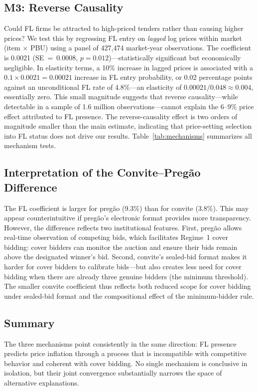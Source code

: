 \subsection{M3: Reverse Causality}

Could FL firms be attracted to high-priced tenders rather than causing
higher prices? We test this by regressing FL entry on \emph{lagged} log
prices within market (item $\times$ PBU) using a panel of 427,474
market-year observations. The coefficient is 0.0021 (SE~=~0.0008,
$p = 0.012$)---statistically significant but economically negligible.
In elasticity terms, a 10\% increase in lagged prices is associated with
a $0.1 \times 0.0021 = 0.00021$ increase in FL entry probability, or
0.02 percentage points against an unconditional FL rate of 4.8\%---an
elasticity of $0.00021 / 0.048 \approx 0.004$, essentially zero. This
small magnitude suggests that reverse causality---while detectable in a
sample of 1.6 million observations---cannot explain the 6--9\% price
effect attributed to FL presence. The reverse-causality effect is two %
orders of magnitude smaller than the main estimate, indicating that
price-setting selection into FL status does not drive our results.
Table~\ref{tab:mechanisms} summarizes all mechanism tests.



\subsection{Interpretation of the Convite--Preg\~ao Difference}

The FL coefficient is larger for preg\~ao (9.3\%) than for convite
(3.8\%). This may appear counterintuitive if preg\~ao's electronic
format provides more transparency. However, the difference reflects
two institutional features. First, preg\~ao allows real-time observation
of competing bids, which facilitates Regime~1 cover bidding: cover
bidders can monitor the auction and ensure their bids remain above the
designated winner's bid. Second, convite's sealed-bid format makes it
harder for cover bidders to calibrate bids---but also creates less need
for cover bidding when there are already three genuine bidders (the
minimum threshold). The smaller convite coefficient thus reflects both
reduced scope for cover bidding under sealed-bid format and the
compositional effect of the minimum-bidder rule.

\subsection{Summary} %

The three mechanisms point consistently in the same direction: FL
presence predicts price inflation through a process that is incompatible
with competitive behavior and coherent with cover bidding. No single
mechanism is conclusive in isolation, but their joint convergence
substantially narrows the space of alternative explanations.
